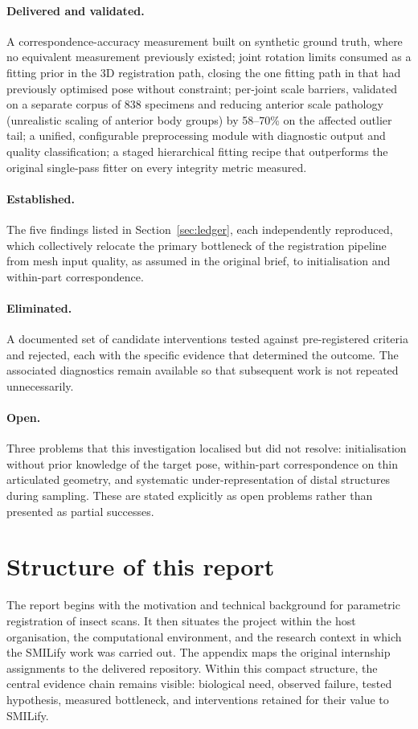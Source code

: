 \paragraph{Delivered and validated.} A correspondence-accuracy measurement
built on synthetic ground truth, where no equivalent measurement previously
existed; joint rotation limits consumed as a fitting prior in the 3D
registration path, closing the one fitting path in  that had
previously optimised pose without constraint; per-joint scale barriers,
validated on a separate corpus of 838 specimens and reducing anterior scale
pathology (unrealistic scaling of anterior body groups) by 58--70\% on the
affected outlier tail; a unified, configurable
preprocessing module with diagnostic output and quality classification; a
staged hierarchical fitting recipe that outperforms the original single-pass
fitter on every integrity metric measured.

\paragraph{Established.} The five findings listed in Section~\ref{sec:ledger}, each
independently reproduced, which collectively relocate the primary bottleneck
of the registration pipeline from mesh input quality, as assumed in the
original brief, to initialisation and within-part correspondence.

\paragraph{Eliminated.} A documented set of candidate interventions tested
against pre-registered criteria and rejected, each with the specific evidence
that determined the outcome. The associated diagnostics remain available so
that subsequent work is not repeated unnecessarily.

\paragraph{Open.} Three problems that this investigation localised but did
not resolve: initialisation without prior knowledge of the target pose,
within-part correspondence on thin articulated geometry, and systematic
under-representation of distal structures during sampling. These are stated
explicitly as open problems rather than presented as partial successes.

\section{Structure of this report}

The report begins with the motivation and technical background for parametric
registration of insect scans. It then situates the project within the host
organisation, the computational environment, and the research context in
which the SMILify work was carried out. The appendix maps the original
internship assignments to the delivered repository. Within this compact
structure, the central evidence chain remains visible: biological need,
observed failure, tested hypothesis, measured bottleneck, and interventions
retained for their value to SMILify.
